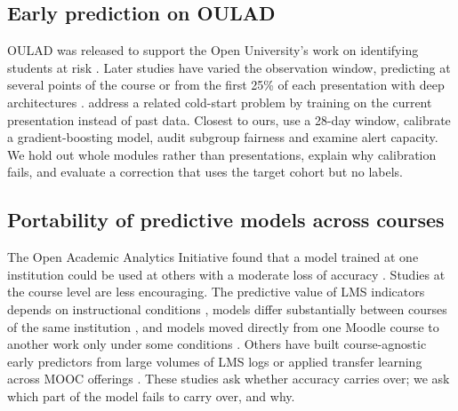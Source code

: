 \documentclass[fleqn,10pt]{JLA_article}
\begin{document}
\subsection{Early prediction on OULAD}
OULAD was released to support the Open University's work on identifying students at risk \parencite{kuzilek2017oulad}. Later studies have varied the observation window, predicting at several points of the course \parencite{adnan2021percentages} or from the first 25\% of each presentation with deep architectures \parencite{malkani2026kronecker}. \textcite{hlosta2017ouroboros} address a related cold-start problem by training on the current presentation instead of past data. Closest to ours, \textcite{wu2026calibrated} use a 28-day window, calibrate a gradient-boosting model, audit subgroup fairness and examine alert capacity. We hold out whole modules rather than presentations, explain why calibration fails, and evaluate a correction that uses the target cohort but no labels.

\subsection{Portability of predictive models across courses}
The Open Academic Analytics Initiative found that a model trained at one institution could be used at others with a moderate loss of accuracy \parencite{jayaprakash2014oaai}. Studies at the course level are less encouraging. The predictive value of LMS indicators depends on instructional conditions \parencite{gasevic2016onesize}, models differ substantially between courses of the same institution \parencite{conijn2017lms}, and models moved directly from one Moodle course to another work only under some conditions \parencite{lopezzambrano2020portability}. Others have built course-agnostic early predictors from large volumes of LMS logs \parencite{riestra2021massive} or applied transfer learning across MOOC offerings \parencite{boyer2015transfer}. These studies ask whether accuracy carries over; we ask which part of the model fails to carry over, and why.
\end{document}
